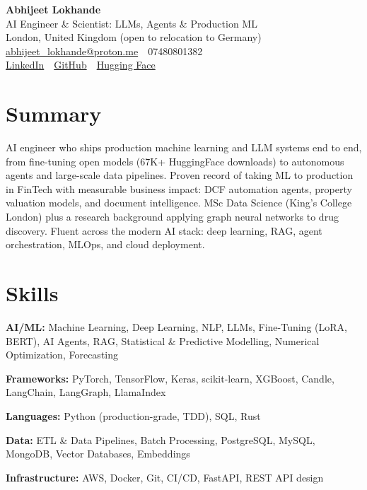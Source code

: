\documentclass[10pt,a4paper]{article}
\newcommand{\sep}{\,\textcolor{accent!60}{\textbar}\,}
\begin{document}
\begin{center}
  {\fontsize{24}{26}\selectfont\bfseries Abhijeet Lokhande}\\[3pt]
  {\color{accent}\large AI Engineer \& Scientist: LLMs, Agents \& Production ML}\\[5pt]
  {\small
    London, United Kingdom (open to relocation to Germany) \sep
    \href{mailto:abhijeet_lokhande@proton.me}{abhijeet\_lokhande@proton.me} \sep
    07480801382 \\[2pt]
    \href{https://www.linkedin.com/in/ablds/}{LinkedIn} \sep
    \href{https://github.com/abhijeetscode}{GitHub} \sep
    \href{https://huggingface.co/ab-ai}{Hugging Face}
  }
\end{center}
\vspace{2pt}

\section{Summary}
AI engineer who ships production machine learning and LLM systems end to end, from fine-tuning open models (67K+ HuggingFace downloads) to autonomous agents and large-scale data pipelines. Proven record of taking ML to production in FinTech with measurable business impact: DCF automation agents, property valuation models, and document intelligence. MSc Data Science (King's College London) plus a research background applying graph neural networks to drug discovery. Fluent across the modern AI stack: deep learning, RAG, agent orchestration, MLOps, and cloud deployment.

\section{Skills}
\begin{tight}
  \item[\textcolor{accent}{\small$\bullet$}] \textbf{AI/ML:} Machine Learning, Deep Learning, NLP, LLMs, Fine-Tuning (LoRA, BERT), AI Agents, RAG, Statistical \& Predictive Modelling, Numerical Optimization, Forecasting
  \item[\textcolor{accent}{\small$\bullet$}] \textbf{Frameworks:} PyTorch, TensorFlow, Keras, scikit-learn, XGBoost, Candle, LangChain, LangGraph, LlamaIndex
  \item[\textcolor{accent}{\small$\bullet$}] \textbf{Languages:} Python (production-grade, TDD), SQL, Rust
  \item[\textcolor{accent}{\small$\bullet$}] \textbf{Data:} ETL \& Data Pipelines, Batch Processing, PostgreSQL, MySQL, MongoDB, Vector Databases, Embeddings
  \item[\textcolor{accent}{\small$\bullet$}] \textbf{Infrastructure:} AWS, Docker, Git, CI/CD, FastAPI, REST API design
\end{tight}
\end{document}
